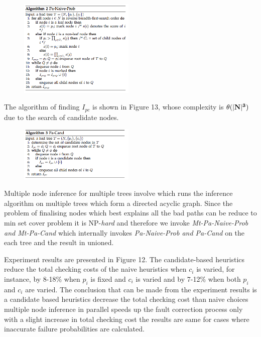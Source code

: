 \documentclass[10pt]{sigplan-proc-varsize}
\begin{document}
\begin{figure}[h!]
  \centering
    \includegraphics[width=0.49\textwidth]{Fig12}
\end{figure}

The algorithm of finding  $I_{pc}$ is shown in Figure 13, whose complexity is ${\bf {\theta(|N|^3 )}}$ due to the search of candidate nodes.
\begin{figure}[h!]
  \centering
    \includegraphics[width=0.49\textwidth]{Fig13}
\end{figure}

Multiple node inference for multiple trees involve which runs the inference algorithm on multiple trees which form a directed acyclic graph. 
Since the problem of finalising nodes which best explains all the bad paths can be reduce to min set cover problem it is NP-{\it hard} and 
therefore we invoke {\it Mt-Pa-Naive-Prob and Mt-Pa-Cand} which internally invokes {\it Pa-Naive-Prob and Pa-Cand} on the each tree and the result in unioned. 

Experiment results are presented in Figure 12. 
The candidate-based heuristics reduce the total checking costs of the naive heuristics when $c_i$ is varied, 
for instance, by 8-18\% when $p_i$ is fixed and $c_i$ is varied and by 7-12\% when both  $p_i$ and $c_i$ are varied. 
The conclusion that can be made from the experiment results is a candidate based heuristics decrease the total checking cost than naive choices 
multiple node inference in parallel speeds up the fault correction process only with a slight increase in total checking cost the results are 
same for cases where inaccurate failure probabilities are calculated. 
\end{document}
